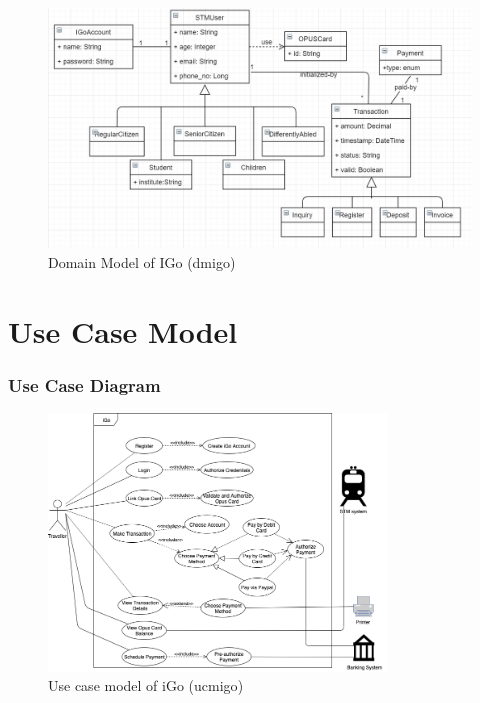 \documentclass[11pt, english]{report}
\begin{document}
 \begin{figure}[H]
  \includegraphics[width=1.0\textwidth]{images/domainModelSTM.png}
  \centering
  \caption{Domain Model of IGo (\gls{dmigo})}
\end{figure}


\chapter{Use Case Model }
\subsection{Use Case Diagram}
 \begin{figure}[H]
  
  \includegraphics[width=0.8\textwidth]{images/usecase.png}
  \centering
  \caption{Use case model of iGo (\gls{ucmigo})}

\end{figure}
\end{document}
